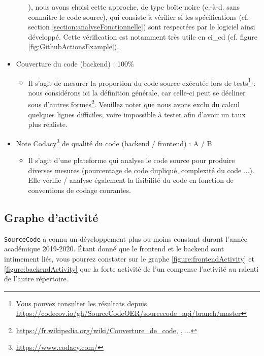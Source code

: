 \begin{itemize}[nosep,noitemsep,topsep=0pt,partopsep=0pt,after=\vspace*{2pt}]
\begin{itemize}[nosep,noitemsep,topsep=0pt,partopsep=0pt,after=\vspace*{2pt}]
{        }), nous avons choisi cette approche, de type boîte noire (c.-à-d. sans connaitre le code source), qui consiste à vérifier si les spécifications (cf. section \ref{section:analyseFonctionnelle}) sont respectées par le logiciel ainsi développé.
        Cette vérification est notamment très utile en \gls{ci_cd} (cf. figure \ref{fig:GithubActionsExample}).
    \end{itemize}
    \item Couverture du code (\gls{backend}) :  100\%
    \begin{itemize}[nosep,noitemsep,topsep=0pt,partopsep=0pt,after=\vspace*{2pt}]
        \item Il s'agit de mesurer la proportion du code source exécutée lors de tests\footnote{
            Vous pouvez consulter les résultats depuis \href{https://codecov.io/gh/SourceCodeOER/sourcecode\_api/branch/master}{https://codecov.io/gh/SourceCodeOER/sourcecode\_api/branch/master}
        } : nous considérons ici la définition générale, car celle-ci peut se décliner sous d'autres formes\footnote{
            \href{https://fr.wikipedia.org/wiki/Couverture\_de\_code}{https://fr.wikipedia.org/wiki/Couverture\_de\_code}, \cite{concept_cfg}, ...
        }.
        Veuillez noter que nous avons exclu du calcul quelques lignes difficiles, voire impossible à tester afin d'avoir un taux plus réaliste.
    \end{itemize}
    \item Note Codacy\footnote{
        \href{https://www.codacy.com/}{https://www.codacy.com/}
    } de qualité du code (\gls{backend} / \gls{frontend}) :  A / B
    \begin{itemize}[nosep,noitemsep,topsep=0pt,partopsep=0pt,after=\vspace*{2pt}]
        \item Il s'agit d'une plateforme qui analyse le code source pour produire diverses mesures (pourcentage de code dupliqué, complexité du code ...).
        Elle vérifie / analyse également la lisibilité du code en fonction de conventions de codage courantes.
    \end{itemize}       
\end{itemize}

\subsection{Graphe d'activité}

\texttt{SourceCode} a connu un développement plus ou moins constant durant l'année académique 2019-2020. Étant donné que le \gls{frontend} et le \gls{backend} sont intimement liés, vous pourrez constater sur le graphe \ref{figure:frontendActivity} et \ref{figure:backendActivity} que la forte activité de l'un compense l'activité au ralenti de l'autre répertoire.

